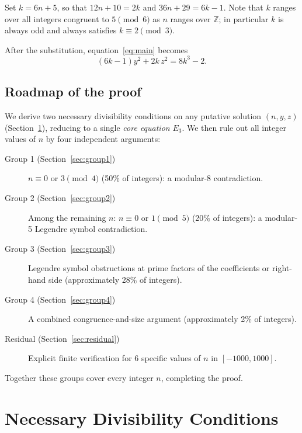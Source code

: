 \documentclass[12pt]{article}
\begin{document}
Set $k = 6n + 5$, so that $12n + 10 = 2k$ and $36n + 29 = 6k - 1$.
Note that $k$ ranges over all integers congruent to $5 \pmod{6}$ as $n$ ranges over $\mathbb{Z}$;
in particular $k$ is always odd and always satisfies $k \equiv 2 \pmod{3}$.

After the substitution, equation~\eqref{eq:main} becomes
\begin{equation}\label{eq:E0}
(6k-1)y^2 + 2k\,z^2 = 8k^3 - 2.
\end{equation}

\subsection{Roadmap of the proof}

We derive two necessary divisibility conditions on any putative solution $(n,y,z)$ 
(Section~\ref{sec:divisiblity}), reducing to a single \emph{core equation} $E_3$.
We then rule out all integer values of $n$ by four independent arguments:

\begin{description}
  \item[Group 1 (Section~\ref{sec:group1})] $n \equiv 0$ or $3 \pmod{4}$ (50\% of integers): 
        a modular-8 contradiction.
  \item[Group 2 (Section~\ref{sec:group2})] Among the remaining $n$: $n \equiv 0$ or $1 \pmod{5}$ 
        (20\% of integers): a modular-5 Legendre symbol contradiction.
  \item[Group 3 (Section~\ref{sec:group3})] Legendre symbol obstructions at prime factors of 
        the coefficients or right-hand side (approximately 28\% of integers).
  \item[Group 4 (Section~\ref{sec:group4})] A combined congruence-and-size argument
        (approximately 2\% of integers).
  \item[Residual (Section~\ref{sec:residual})] Explicit finite verification for
        6 specific values of $n$ in $[-1000, 1000]$.
\end{description}

Together these groups cover every integer $n$, completing the proof.

\section{Necessary Divisibility Conditions}\label{sec:divisiblity}
\end{document}
